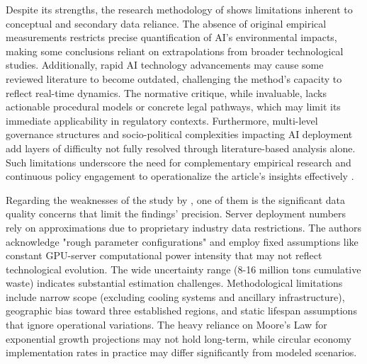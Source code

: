\documentclass[a4paper, 12pt]{article}
\begin{document}
\par Despite its strengths, the research methodology of \citet{Zhuk2023} shows limitations inherent to conceptual and secondary data reliance. The absence of original empirical measurements restricts precise quantification of AI’s environmental impacts, making some conclusions reliant on extrapolations from broader technological studies. Additionally, rapid AI technology advancements may cause some reviewed literature to become outdated, challenging the method’s capacity to reflect real-time dynamics. The normative critique, while invaluable, lacks actionable procedural models or concrete legal pathways, which may limit its immediate applicability in regulatory contexts. Furthermore, multi-level governance structures and socio-political complexities impacting AI deployment add layers of difficulty not fully resolved through literature-based analysis alone. Such limitations underscore the need for complementary empirical research and continuous policy engagement to operationalize the article’s insights effectively \citep[pp.~964--967]{Zhuk2023}.
\par Regarding the weaknesses of the study by \cite{wang_2024_ewaste}, one of them is the significant data quality concerns that limit the findings' precision. Server deployment numbers rely on approximations due to proprietary industry data restrictions. The authors acknowledge "rough parameter configurations" and employ fixed assumptions like constant GPU-server computational power intensity that may not reflect technological evolution. The wide uncertainty range (8-16 million tons cumulative waste) indicates substantial estimation challenges. Methodological limitations include narrow scope (excluding cooling systems and ancillary infrastructure), geographic bias toward three established regions, and static lifespan assumptions that ignore operational variations. The heavy reliance on Moore's Law for exponential growth projections may not hold long-term, while circular economy implementation rates in practice may differ significantly from modeled scenarios.
\end{document}
